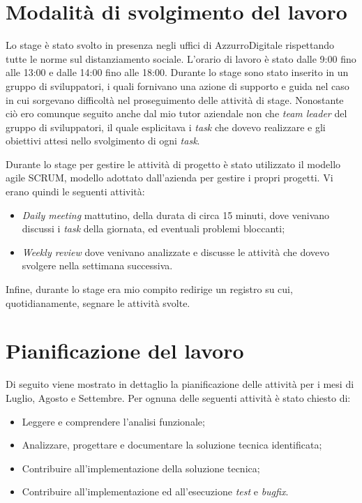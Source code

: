 \section{Modalità di svolgimento del lavoro}
Lo stage è stato svolto in presenza negli uffici di AzzurroDigitale rispettando tutte le norme sul distanziamento sociale. L'orario di lavoro è stato dalle 9:00 fino alle 13:00 e dalle 14:00 fino alle 18:00. Durante lo stage sono stato inserito in un gruppo di sviluppatori, i quali fornivano una azione di supporto e guida nel caso in cui sorgevano difficoltà nel proseguimento delle attività di stage. Nonostante ciò ero comunque seguito anche dal mio tutor aziendale non che \emph{team leader} del gruppo di sviluppatori, il quale esplicitava i \emph{task} che dovevo realizzare e gli obiettivi attesi nello svolgimento di ogni \emph{task}. 

Durante lo stage per gestire le attività di progetto è stato utilizzato il modello agile \gls{SCRUM}\glsfirstoccur, modello adottato dall'azienda per gestire i propri progetti.
Vi erano quindi le seguenti attività:
\begin{itemize}
	\item \emph{Daily meeting} mattutino, della durata di circa 15 minuti, dove venivano discussi i \emph{task} della giornata, ed eventuali problemi bloccanti;
	\item \emph{Weekly review} dove venivano analizzate e discusse le attività che dovevo svolgere nella settimana successiva.
\end{itemize}

Infine, durante lo stage era mio compito redirige un registro su cui, quotidianamente, segnare le attività svolte.

\section{Pianificazione del lavoro}

Di seguito viene mostrato in dettaglio la pianificazione delle attività per i mesi di Luglio, Agosto e Settembre.
Per ognuna delle seguenti attività è stato chiesto di:
\begin{itemize}
	\item Leggere e comprendere l’analisi funzionale;
	\item Analizzare, progettare e documentare la soluzione tecnica identificata;
	\item Contribuire all’implementazione della soluzione tecnica;
	\item Contribuire all’implementazione ed all’esecuzione \emph{test} e \emph{bugfix}.
\end{itemize}

